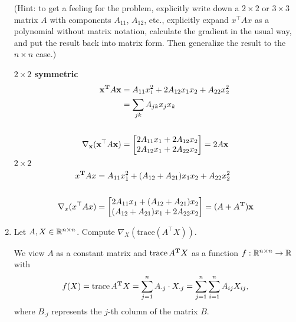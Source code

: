 \documentclass{article}
\begin{document}
\begin{enumerate}[label=(\alph*)]
    (Hint: to get a feeling for the problem, explicitly write down a $2 \times 2$ or $3 \times 3$ matrix $A$ with components $A_{11}$, $A_{12}$, etc., explicitly expand $x^{\top}Ax$ as a polynomial without matrix notation, calculate the gradient in the usual way, and put the result back into matrix form. Then generalize the result to the $n \times n$ case.)
    \begin{mdframed}
      \textbf{$2 \times 2$ symmetric}
      \begin{align*}
        \mathbf x^{\mathbf{T}} A\mathbf x &= A_{11}x_1^2 + 2A_{12}x_1x_2 + A_{22}x_2^2 \\
                  &= \sum_{jk}A_{jk}x_jx_k \\
        \\
        \nabla_\mathbf x(\mathbf x^{\top} A\mathbf x) &=
        \begin{bmatrix}2A_{11}x_1 + 2A_{12}x_2\\2A_{12}x_1 + 2A_{22}x_2\end{bmatrix} = 2A\mathbf x
      \end{align*}
      \textbf{$2 \times 2$}
      \begin{align*}
        x^{\mathbf{T}} Ax &= A_{11}x_1^2 + (A_{12} + A_{21})x_1x_2 + A_{22}x_2^2 \\\\
        \nabla_x(x^{\top} Ax) &=
        \begin{bmatrix}2A_{11}x_1 + (A_{12} + A_{21})x_2\\(A_{12} + A_{21})x_1 + 2A_{22}x_2\end{bmatrix} = (A + A^{\mathbf{T}})\mathbf x
      \end{align*}
    \end{mdframed}

    \item Let $A, X \in \mathbb{R}^{n \times n}$. Compute $\nabla_X (\text{trace}(A^{\top}X))$.
    \begin{mdframed}
      We view $A$ as a constant matrix and $\operatorname{\text{trace}} A^{\mathbf{T}} X$ as a function
      $f:\mathbb{R}^{n \times n} \rightarrow \mathbb{R}$ with
      $$
      f(X)
      = \operatorname{\text{trace}} A^{\mathbf{T}} X
      = \sum_{j=1}^n A_{\cdot j} \cdot X_{\cdot j}
      = \sum_{j=1}^n \sum_{i=1}^n A_{ij}X_{ij},
      $$
      where $B_{\cdot j}$ represents the $j$-th column of the matrix $B$.


\end{mdframed}
\end{enumerate}
\end{document}
